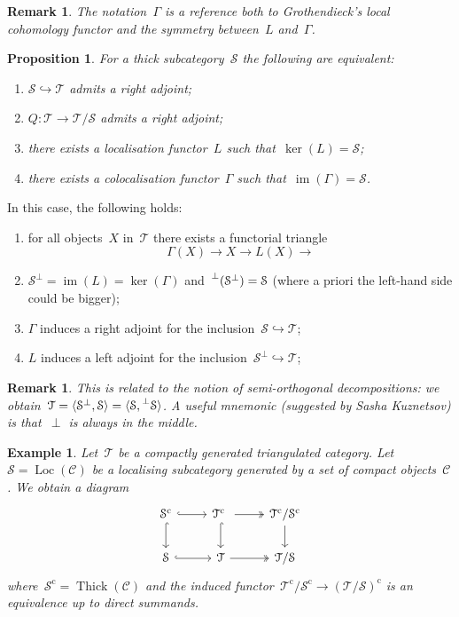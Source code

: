 \documentclass[10pt,a4paper]{article}
\theoremstyle{lecture}
\newtheorem{example}[theorem]{Example}
\newtheorem{proposition}[theorem]{Proposition}
\newtheorem{remark}[theorem]{Remark}
\newcommand\cc{\ensuremath{\mathrm{c}}}
\DeclareMathOperator\image{im}
\DeclareMathOperator\Loc{Loc}
\DeclareMathOperator\Thick{Thick}
\begin{document}
\begin{remark}
  The notation~$\Gamma$ is a reference both to Grothendieck's local cohomology functor and the symmetry between~$L$ and~$\Gamma$.
\end{remark}
\begin{proposition}
  For a thick subcategory~$\mathcal{S}$ the following are equivalent:
  \begin{enumerate}
    \item $\mathcal{S}\hookrightarrow\mathcal{T}$ admits a right adjoint;
    \item $Q\colon\mathcal{T}\to\mathcal{T}/\mathcal{S}$ admits a right adjoint;
    \item there exists a localisation functor~$L$ such that~$\ker(L)=\mathcal{S}$;
    \item there exists a colocalisation functor~$\Gamma$ such that~$\image(\Gamma)=\mathcal{S}$.
  \end{enumerate}
\end{proposition}
In this case, the following holds:
\begin{enumerate}
  \item for all objects~$X$ in~$\mathcal{T}$ there exists a functorial triangle
    \begin{equation}
      \Gamma(X)\to X\to L(X)\to
    \end{equation}
  \item $\mathcal{S}^\perp=\image(L)=\ker(\Gamma)$ and~$\prescript{\perp}{}{(}\mathcal{S}^\perp)=\mathcal{S}$ (where a priori the left-hand side could be bigger);
  \item $\Gamma$ induces a right adjoint for the inclusion~$\mathcal{S}\hookrightarrow\mathcal{T}$;
  \item $L$ induces a left adjoint for the inclusion~$\mathcal{S}^\perp\hookrightarrow\mathcal{T}$;
\end{enumerate}
\begin{remark}
  This is related to the notion of semi-orthogonal decompositions: we obtain~$\mathcal{T}=\langle\mathcal{S}^\perp,\mathcal{S}\rangle=\langle\mathcal{S},\prescript{\perp}{}{\mathcal{S}}\rangle$. A useful mnemonic (suggested by Sasha Kuznetsov) is that~$\perp$ is always in the middle.
\end{remark}
\begin{example}
  Let~$\mathcal{T}$ be a compactly generated triangulated category. Let~$\mathcal{S}=\Loc(\mathcal{C})$ be a localising subcategory generated by a set of compact objects~$\mathcal{C}$. We obtain a diagram
  \begin{equation}
    \begin{tikzcd}
      \mathcal{S}^\cc \arrow[hook]{r} \arrow[hook]{d} & \mathcal{T}^\cc \arrow[two heads]{r} \arrow[hook]{d} & \mathcal{T}^\cc/\mathcal{S}^\cc \arrow{d} \\
      \mathcal{S} \arrow[hook]{r} & \mathcal{T} \arrow[two heads]{r} & \mathcal{T}/\mathcal{S}
    \end{tikzcd}
  \end{equation}
  where~$\mathcal{S}^\cc=\Thick(\mathcal{C})$ and the induced functor~$\mathcal{T}^\cc/\mathcal{S}^\cc\to(\mathcal{T}/\mathcal{S})^\cc$ is an equivalence up to direct summands.
\end{example}
\end{document}
